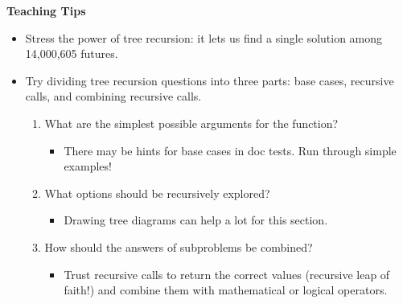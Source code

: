 \begin{blocksection}
\begin{guide}
\textbf{Teaching Tips}
\begin{itemize}
    \item Stress the power of tree recursion: it lets us find a single solution among 14,000,605 futures.
    \item Try dividing tree recursion questions into three parts: base cases, recursive calls, and combining recursive calls.
    \begin{enumerate}
        \item What are the simplest possible arguments for the function?
        \begin{itemize}
            \item There may be hints for base cases in doc tests. Run through simple examples!
        \end{itemize}
        \item What options should be recursively explored?
        \begin{itemize}
            \item Drawing tree diagrams can help a lot for this section.
        \end{itemize}
        \item How should the answers of subproblems be combined?
        \begin{itemize}
            \item Trust recursive calls to return the correct values (recursive leap of faith!) and combine them with mathematical or logical operators.
        \end{itemize}
    \end{enumerate}
\end{itemize}
\end{guide}
\end{blocksection}
